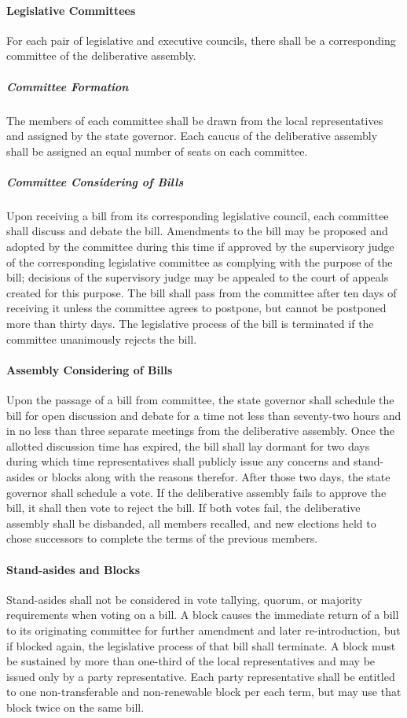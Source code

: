 \documentclass{article}
\begin{document}
\paragraph{Legislative Committees}
For each pair of legislative and executive councils, there shall be a corresponding committee of the deliberative assembly.
\subparagraph{Committee Formation}
The members of each committee shall be drawn from the local representatives and assigned by the state governor. Each caucus of the deliberative assembly shall be assigned an equal number of seats on each committee. 
\subparagraph{Committee Considering of Bills}
Upon receiving a bill from its corresponding legislative council, each committee shall discuss and debate the bill. Amendments to the bill may be proposed and adopted by the committee during this time if approved by the supervisory judge of the corresponding legislative committee as complying with the purpose of the bill; decisions of the supervisory judge may be appealed to the court of appeals created for this purpose. The bill shall pass from the committee after ten days of receiving it unless the committee agrees to postpone, but cannot be postponed more than thirty days. The legislative process of the bill is terminated if the committee unanimously rejects the bill.
\paragraph{Assembly Considering of Bills}
Upon the passage of a bill from committee, the state governor shall schedule the bill for open discussion and debate for a time not less than seventy-two hours and in no less than three separate meetings from the deliberative assembly. Once the allotted discussion time has expired, the bill shall lay dormant for two days during which time representatives shall publicly issue any concerns and stand-asides or blocks along with the reasons therefor. After those two days, the state governor shall schedule a vote. If the deliberative assembly fails to approve the bill, it shall then vote to reject the bill. If both votes fail, the deliberative assembly shall be disbanded, all members recalled, and new elections held to chose successors to complete the terms of the previous members.
\paragraph{Stand-asides and Blocks}
Stand-asides shall not be considered in vote tallying, quorum, or majority requirements when voting on a bill. A block causes the immediate return of a bill to its originating committee for further amendment and later re-introduction, but if blocked again, the legislative process of that bill shall terminate. A block must be sustained by more than one-third of the local representatives and may be issued only by a party representative. Each party representative shall be entitled to one non-transferable and non-renewable block per each term, but may use that block twice on the same bill.
\end{document}
